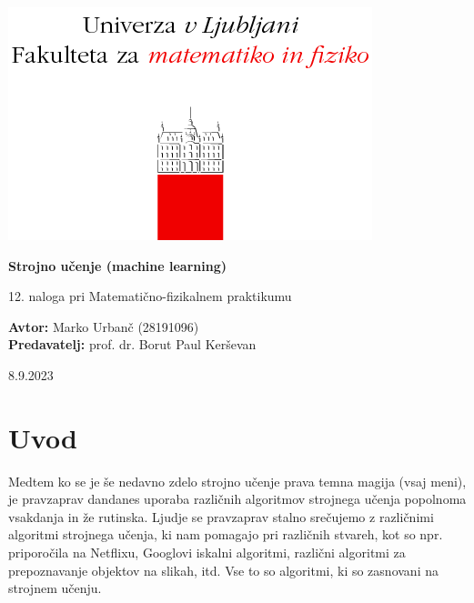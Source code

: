 \documentclass[a4paper]{article}
\begin{document}
\begin{titlepage}
    \begin{center}
        \includegraphics[]{logo.png}
        \vspace*{3cm}
        
        \Huge
        \textbf{Strojno učenje (machine learning)}
        
        \vspace{0.5cm}
        \large
        12. naloga pri Matematično-fizikalnem praktikumu

        \vspace{4.5cm}
        
        \textbf{Avtor:} Marko Urbanč (28191096)\ \\
        \textbf{Predavatelj:} prof. dr. Borut Paul Kerševan\ \\
        
        \vspace{2.8cm}
        
        \large
        8.9.2023
    \end{center}
\end{titlepage}
\tableofcontents
\newpage
\section{Uvod}
Medtem ko se je še nedavno zdelo strojno učenje prava temna magija (vsaj meni), je pravzaprav dandanes
uporaba različnih algoritmov strojnega učenja popolnoma vsakdanja in že rutinska. Ljudje se pravzaprav 
stalno srečujemo z različnimi algoritmi strojnega učenja, ki nam pomagajo pri različnih stvareh, kot so
npr. priporočila na Netflixu, Googlovi iskalni algoritmi, različni algoritmi za prepoznavanje objektov na
slikah, itd. Vse to so algoritmi, ki so zasnovani na strojnem učenju. \\
\end{document}

